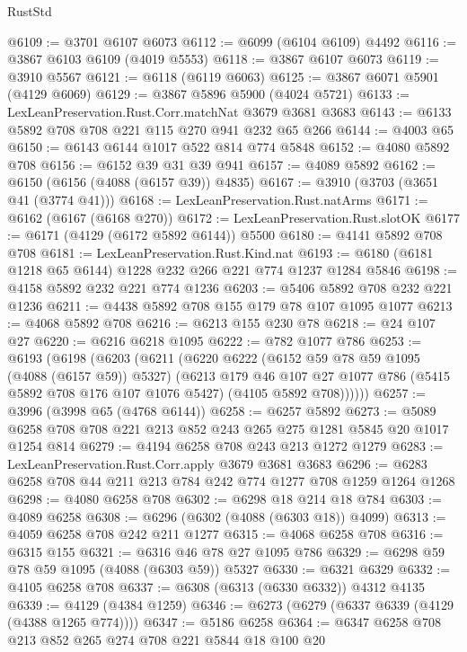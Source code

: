 \begin{lexlean}{RustStd}
\begin{coremodule}
{\begin{coremodule}
{{{{{{{{{{{{{{@6109 := @3701 @6107 @6073
@6112 := @6099 (@6104 @6109) @4492
@6116 := @3867 @6103 @6109 (@4019 @5553)
@6118 := @3867 @6107 @6073
@6119 := @3910 @5567
@6121 := @6118 (@6119 @6063)
@6125 := @3867 @6071 @5901 (@4129 @6069)
@6129 := @3867 @5896 @5900 (@4024 @5721)
@6133 := LexLeanPreservation.Rust.Corr.matchNat @3679 @3681 @3683
@6143 := @6133 @5892 @708 @708 @221 @115 @270 @941 @232 @65 @266
@6144 := @4003 @65
@6150 := @6143 @6144 @1017 @522 @814 @774 @5848
@6152 := @4080 @5892 @708
@6156 := @6152 @39 @31 @39 @941
@6157 := @4089 @5892
@6162 := @6150 (@6156 (@4088 (@6157 @39)) @4835)
@6167 := @3910 (@3703 (@3651 @41 (@3774 @41)))
@6168 := LexLeanPreservation.Rust.natArms
@6171 := @6162 (@6167 (@6168 @270))
@6172 := LexLeanPreservation.Rust.slotOK
@6177 := @6171 (@4129 (@6172 @5892 @6144)) @5500
@6180 := @4141 @5892 @708 @708
@6181 := LexLeanPreservation.Rust.Kind.nat
@6193 := @6180 (@6181 @1218 @65 @6144) @1228 @232 @266 @221 @774 @1237 @1284 @5846
@6198 := @4158 @5892 @232 @221 @774 @1236
@6203 := @5406 @5892 @708 @232 @221 @1236
@6211 := @4438 @5892 @708 @155 @179 @78 @107 @1095 @1077
@6213 := @4068 @5892 @708
@6216 := @6213 @155 @230 @78
@6218 := @24 @107 @27
@6220 := @6216 @6218 @1095
@6222 := @782 @1077 @786
@6253 := @6193
    (@6198
      (@6203
        (@6211
          (@6220
            @6222
            (@6152 @59 @78 @59 @1095 (@4088 (@6157 @59)) @5327)
            (@6213
              @179
              @46
              @107
              @27
              @1077
              @786
              (@5415 @5892 @708 @176 @107 @1076 @5427)
              (@4105 @5892 @708))))))
@6257 := @3996 (@3998 @65 (@4768 @6144))
@6258 := @6257 @5892
@6273 := @5089 @6258 @708 @708 @221 @213 @852 @243 @265 @275 @1281 @5845 @20 @1017 @1254 @814
@6279 := @4194 @6258 @708 @243 @213 @1272 @1279
@6283 := LexLeanPreservation.Rust.Corr.apply @3679 @3681 @3683
@6296 := @6283 @6258 @708 @44 @211 @213 @784 @242 @774 @1277 @708 @1259 @1264 @1268
@6298 := @4080 @6258 @708
@6302 := @6298 @18 @214 @18 @784
@6303 := @4089 @6258
@6308 := @6296 (@6302 (@4088 (@6303 @18)) @4099)
@6313 := @4059 @6258 @708 @242 @211 @1277
@6315 := @4068 @6258 @708
@6316 := @6315 @155
@6321 := @6316 @46 @78 @27 @1095 @786
@6329 := @6298 @59 @78 @59 @1095 (@4088 (@6303 @59)) @5327
@6330 := @6321 @6329
@6332 := @4105 @6258 @708
@6337 := @6308 (@6313 (@6330 @6332)) @4312 @4135
@6339 := @4129 (@4384 @1259)
@6346 := @6273 (@6279 (@6337 @6339 (@4129 (@4388 @1265 @774))))
@6347 := @5186 @6258
@6364 := @6347
    @6258
    @708
    @213
    @852
    @265
    @274
    @708
    @221
    @5844
    @18
    @100
    @20
}}}}}}}}}}}}}}
\end{coremodule}}
\end{coremodule}
\end{lexlean}
